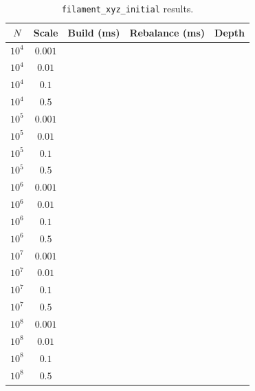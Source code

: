 \begin{table}[ht]
    \centering
    \caption{\texttt{filament\_xyz\_initial} results.}
    \label{tab:filament_xyz_results}
    \begin{tabular}{|c|c|c|c|c|}
        \hline
        \textbf{$N$} & \textbf{Scale} & \textbf{Build (ms)} & \textbf{Rebalance (ms)} & \textbf{Depth} \\
        \hline
        $10^4$ & $0.001$ & & & \\
        $10^4$ & $0.01$  & & & \\
        $10^4$ & $0.1$   & & & \\
        $10^4$ & $0.5$   & & & \\
        \hline
        $10^5$ & $0.001$ & & & \\
        $10^5$ & $0.01$  & & & \\
        $10^5$ & $0.1$   & & & \\
        $10^5$ & $0.5$   & & & \\
        \hline
        $10^6$ & $0.001$ & & & \\
        $10^6$ & $0.01$  & & & \\
        $10^6$ & $0.1$   & & & \\
        $10^6$ & $0.5$   & & & \\
        \hline
        $10^7$ & $0.001$ & & & \\
        $10^7$ & $0.01$  & & & \\
        $10^7$ & $0.1$   & & & \\
        $10^7$ & $0.5$   & & & \\
        \hline
        $10^8$ & $0.001$ & & & \\
        $10^8$ & $0.01$  & & & \\
        $10^8$ & $0.1$   & & & \\
        $10^8$ & $0.5$   & & & \\
        \hline
    \end{tabular}
\end{table}
